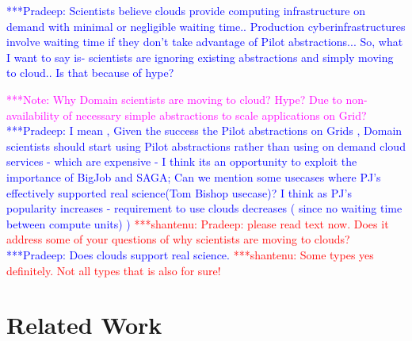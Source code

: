 \documentclass[times]{cpeauth}
\newcommand{\jhanote}[1]{ {\textcolor{red} { ***shantenu: #1 }}}
\newcommand{\pmnote}[1]{ {\textcolor{blue} { ***Pradeep: #1 }}}
\newcommand{\note}[1]{ {\textcolor{magenta} { ***Note: #1 }}}
\newcommand{\pmnote}[1]{}
\newcommand{\jhanote}[1]{}
\newcommand{\note}[1]{}
\begin{document}


\pmnote{ Scientists believe clouds provide computing infrastructure on
  demand with minimal or negligible waiting time..  Production
  cyberinfrastructures involve waiting time if they don't take
  advantage of Pilot abstractions...  So, what I want to say is-
  scientists are ignoring existing abstractions and simply moving to
  cloud.. Is that because of hype? }

\note{Why Domain scientists are moving to cloud? Hype? Due to
  non-availability of necessary simple abstractions to scale
  applications on Grid?}  \pmnote{ I mean , Given the success the
  Pilot abstractions on Grids , Domain scientists should start using
  Pilot abstractions rather than using on demand cloud services -
  which are expensive - I think its an opportunity to exploit the
  importance of BigJob and SAGA; Can we mention some usecases where
  PJ's effectively supported real science(Tom Bishop usecase)?  I
  think as PJ's popularity increases - requirement to use clouds
  decreases ( since no waiting time between compute units) )}
\jhanote{Pradeep: please read text now. Does it address some of your
  questions of why scientists are moving to clouds?}  \pmnote{Does
  clouds support real science.}\jhanote{Some types yes definitely. Not
  all types that is also for sure!}






\section{Related Work}
\end{document}

